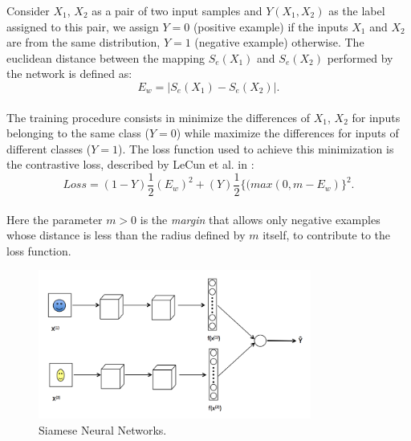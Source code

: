 Consider $X_1$, $X_2$ as a pair of two input samples and $Y(X_1, X_2)$ as the label assigned to this pair, we assign $Y = 0$ (positive example) if the inputs $X_1$ and $X_2$ are from the same distribution, $Y = 1$ (negative example) otherwise. The euclidean distance between the mapping $S_e(X_1)$ and $S_e(X_2)$ performed by the network is defined as:
\begin{equation}
E_w = \left|{S_e (X_1) - S_e (X_2)}\right|.
\end{equation}\\
The training procedure consists in minimize the differences of $X_1$, $X_2$ for inputs belonging to the same class ($Y = 0$) while maximize the differences for inputs of different classes ($Y = 1$).
The loss function used to achieve this minimization is the contrastive loss, described by LeCun et al. in \cite{chopra2005learning}:
\begin{equation}
Loss = (1 - Y)\frac{1}{2}(E_w)^2 + (Y)\frac{1}{2}\{(max(0, m - E_w)\}^2 .
\end{equation}\\
Here the parameter $m > 0$ is the \textit{margin} that allows only negative examples whose distance is less than the radius defined by $m$ itself, to contribute to the loss function.


\begin{figure}[h]
	\centering
	\includegraphics[width=0.8\textwidth]{img/siamese_basic.png}
	\caption[Siamese DNN]{Siamese Neural Networks.}
	\label{fig:siamese}
\end{figure}


